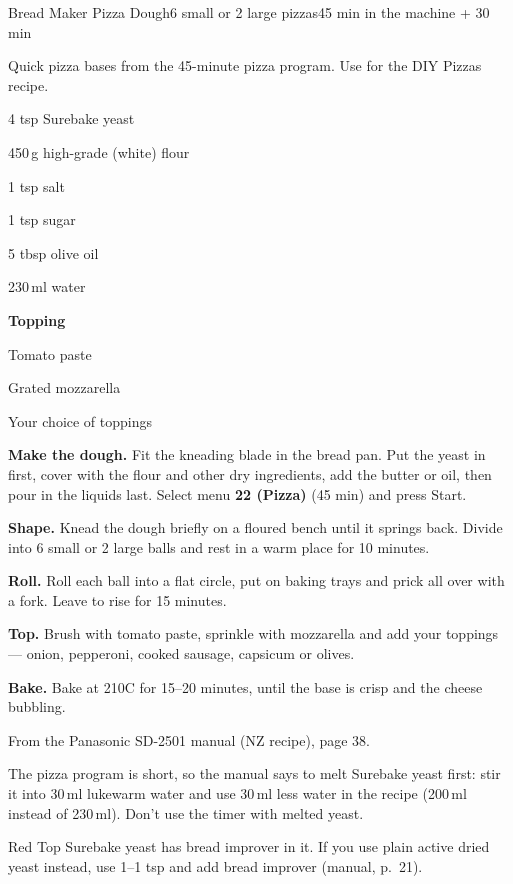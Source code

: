 \begin{recipebox}{Bread Maker Pizza Dough}{6 small or 2 large pizzas}{45 min in the machine + 30 min}

Quick pizza bases from the 45-minute pizza program. Use for the DIY Pizzas recipe.

\begin{ingredients}
  \item 4 tsp Surebake yeast
  \item 450\,g high-grade (white) flour
  \item 1 tsp salt
  \item 1 tsp sugar
  \item 5 tbsp olive oil
  \item 230\,ml water
  \item[] \textbf{Topping}
  \item Tomato paste
  \item Grated mozzarella
  \item Your choice of toppings
\end{ingredients}

\begin{method}
  \item \textbf{Make the dough.} Fit the kneading blade in the bread pan. Put the yeast in first, cover with the flour and other dry ingredients, add the butter or oil, then pour in the liquids last. Select menu \textbf{22 (Pizza)} (45 min) and press Start.
  \item \textbf{Shape.} Knead the dough briefly on a floured bench until it springs back. Divide into 6 small or 2 large balls and rest in a warm place for 10 minutes.
  \item \textbf{Roll.} Roll each ball into a flat circle, put on baking trays and prick all over with a fork. Leave to rise for 15 minutes.
  \item \textbf{Top.} Brush with tomato paste, sprinkle with mozzarella and add your toppings --- onion, pepperoni, cooked sausage, capsicum or olives.
  \item \textbf{Bake.} Bake at 210\degree C for 15--20 minutes, until the base is crisp and the cheese bubbling.
\end{method}

\begin{notelist}
  \item From the Panasonic SD-2501 manual (NZ recipe), page 38.
  \item The pizza program is short, so the manual says to melt Surebake yeast first: stir it into 30\,ml lukewarm water and use 30\,ml less water in the recipe (200\,ml instead of 230\,ml). Don't use the timer with melted yeast.
  \item Red Top Surebake yeast has bread improver in it. If you use plain active dried yeast instead, use 1--1 tsp and add bread improver (manual, p.~21).
\end{notelist}

\end{recipebox}

